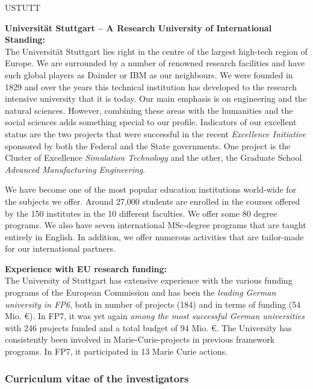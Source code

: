 \begin{sitedescription}{USTUTT} \label{desc:USTUTT}

{\bf Universität Stuttgart -- A Research University of International Standing:}\\
The Universität Stuttgart lies right in the centre of the largest high-tech region of Europe. We are surrounded by a number of renowned research facilities and have such global players as Daimler or IBM as our neighbours. We were founded in 1829 and over the years this technical institution has developed to the research intensive university that it is today. Our main emphasis is on engineering and the natural sciences. However, combining these areas with the humanities and the social sciences adds something special to our profile.
%
Indicators of our excellent status are the two projects that were successful in the recent {\it Excellence Initiative} sponsored by both the Federal and the State governments. One project is the Cluster of Excellence {\it Simulation Technology} and the other, the Graduate School {\it Advanced Manufacturing Engineering}.

We have become one of the most popular education institutions world-wide for the subjects we offer. Around 27,000 students are enrolled in the courses offered by the 150 institutes in the 10 different faculties. We offer some 80 degree programs. We also have seven international MSc-degree programs that are taught entirely in English. In addition, we offer numerous activities that are tailor-made for our international partners.

{\bf Experience with EU research funding:}\\
The University of Stuttgart has extensive experience with the various funding programs of the European Commission and has been the {\it leading German university in FP6}, both in number of projects (184) and in terms of funding (54 Mio. \euro). In FP7, it was yet again {\it among the most successful German universities} with 246 projects funded and a total budget of 94 Mio. \euro. The University has consistently been involved in Marie-Curie-projects in previous framework programs. In FP7, it participated in 13 Marie Curie actions.

\subsubsection*{Curriculum vitae of the investigators}





\end{sitedescription}
